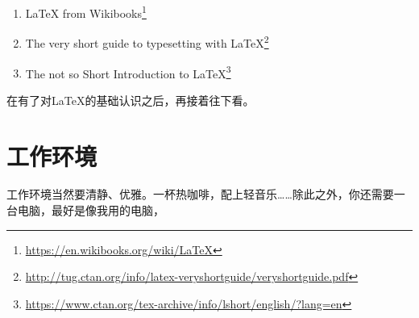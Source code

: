 \documentclass{swfcthesis}
\begin{document}
\begin{enumerate}
\item \LaTeX{} from Wikibooks\footnote{\url{https://en.wikibooks.org/wiki/LaTeX}}
\item The very short guide to typesetting with
  \LaTeX{}\footnote{\url{http://tug.ctan.org/info/latex-veryshortguide/veryshortguide.pdf}}
\item The not so Short Introduction to
  \LaTeX{}\footnote{\url{https://www.ctan.org/tex-archive/info/lshort/english/?lang=en}}
\end{enumerate}

在有了对\LaTeX{}的基础认识之后，再接着往下看。

\section{工作环境}
\label{sec:env}

工作环境当然要清静、优雅。一杯热咖啡，配上轻音乐……除此之外，你还需要一台电脑，最好是像我用的电脑，
\end{document}
